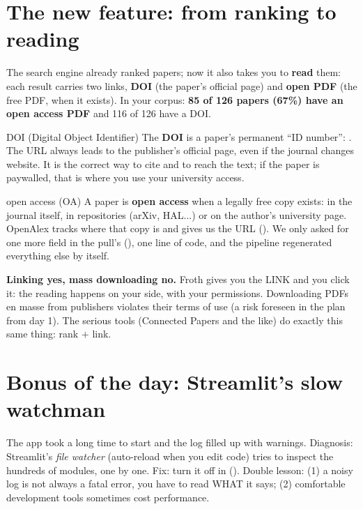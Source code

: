 \documentclass[11pt,a4paper]{article}
\begin{document}
\section{The new feature: from ranking to reading}

The search engine already ranked papers; now it also takes you to \textbf{read} them: each
result carries two links, \textbf{DOI} (the paper's official page) and \textbf{open PDF} (the
free PDF, when it exists). In your corpus: \textbf{85 of 126 papers (67\%) have an open access
PDF} and 116 of 126 have a DOI.

\begin{concepto}{DOI (Digital Object Identifier)}
The \textbf{DOI} is a paper's permanent ``ID number'': . The URL
 always leads to the publisher's official page, even if the
journal changes website. It is the correct way to cite and to reach the text; if the paper is
paywalled, that is where you use your university access.
\end{concepto}

\begin{concepto}{open access (OA)}
A paper is \textbf{open access} when a legally free copy exists: in the journal itself, in
repositories (arXiv, HAL...) or on the author's university page. OpenAlex tracks where that
copy is and gives us the URL (). We only asked for one more field in the
pull's  (), one line of code, and the pipeline regenerated
everything else by itself.
\end{concepto}

\begin{ojo}
\textbf{Linking yes, mass downloading no.} Froth gives you the LINK and you click it: the
reading happens on your side, with your permissions. Downloading PDFs en masse from publishers
violates their terms of use (a risk foreseen in the plan from day 1). The serious tools
(Connected Papers and the like) do exactly this same thing: rank $+$ link.
\end{ojo}

\section{Bonus of the day: Streamlit's slow watchman}

The app took a long time to start and the log filled up with  warnings.
Diagnosis: Streamlit's \emph{file watcher} (auto-reload when you edit code) tries to inspect
the hundreds of  modules, one by one. Fix: turn it off in
 (). Double lesson: (1) a noisy
log is not always a fatal error, you have to read WHAT it says; (2) comfortable development
tools sometimes cost performance.
\end{document}
